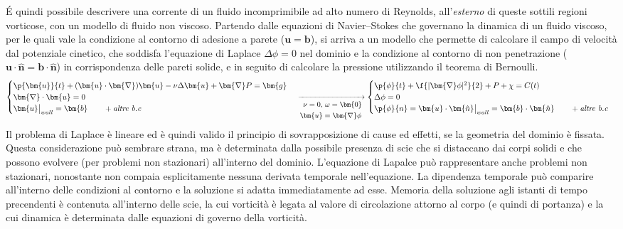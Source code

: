 \noindent
\'E quindi possibile descrivere una corrente di un fluido incomprimibile ad alto numero di Reynolds, all'\textit{esterno} di queste sottili regioni vorticose, con un modello di fluido non viscoso. Partendo dalle equazioni di Navier--Stokes che governano la dinamica di un fluido viscoso, per le quali vale la condizione al contorno di adesione a parete ($\bm{u} = \bm{b}$), si arriva a un modello che permette di calcolare il campo di velocità dal potenziale cinetico, che soddisfa l'equazione di Laplace $\Delta \phi = 0$ nel dominio e la condizione al contorno di non penetrazione ($\bm{u} \cdot \bm{\hat{n}} = \bm{b} \cdot \bm{\hat{n}}$) in corrispondenza delle pareti solide, e in seguito di calcolare la pressione utilizzando il teorema di Bernoulli.
\begin{equation}
 \begin{cases}
  \p{\bm{u}}{t} + (\bm{u} \cdot \bm{\nabla}) \bm{u} - \nu \Delta \bm{u} + \bm{\nabla}P = \bm{g} \\
  \bm{\nabla} \cdot \bm{u} = 0 \\
  \bm{u}\big|_{wall} = \bm{b}  \qquad + \textit{altre b.c}
 \end{cases}
 \xrightarrow[{\small \begin{aligned} \nu = 0 , & \ \omega = \bm{0} \\ \bm{u} & = \bm{\nabla}\phi \end{aligned} }]{}
  \begin{cases}
  \p{\phi}{t} + \f{|\bm{\nabla}\phi|^2}{2} + P + \chi = C(t) \\
  \Delta \phi = 0 \\
  \p{\phi}{n} = \bm{u}\cdot\bm{\hat{n}} \big|_{wall} = \bm{b}\cdot\bm{\hat{n}} \qquad +  \textit{altre b.c} \\
 \end{cases}
\end{equation}
Il problema di Laplace è lineare ed è quindi valido il principio di sovrapposizione di cause ed effetti, se la geometria del dominio è fissata. Questa considerazione può sembrare strana, ma è determinata dalla possibile presenza di scie che si distaccano dai corpi solidi e che possono evolvere (per problemi non stazionari) all'interno del dominio.
L'equazione di Lapalce può rappresentare anche problemi non stazionari, nonostante non compaia esplicitamente nessuna derivata temporale nell'equazione. La dipendenza temporale può comparire all'interno delle condizioni al contorno e la soluzione si adatta immediatamente ad esse. Memoria della soluzione agli istanti di tempo precendenti è contenuta all'interno delle scie, la cui vorticità è legata al valore di circolazione attorno al corpo (e quindi di portanza) e la cui dinamica è determinata dalle equazioni di governo della vorticità.




